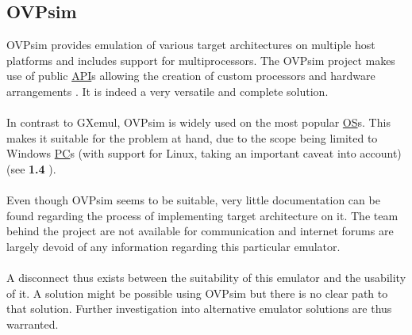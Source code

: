 \subsection{OVPsim}
\label{OVPsim}
OVPsim provides emulation of various target architectures on multiple host platforms and includes support for multiprocessors. The OVPsim project makes use of public \hyperref[listAbr]{API}s allowing the creation of custom processors and hardware arrangements \cite{Imperas2020}. It is indeed a very versatile and complete solution.
\\\\
In contrast to GXemul, OVPsim is widely used on the most popular \hyperref[listAbr]{OS}s. This makes it suitable for the problem at hand, due to the scope being limited to Windows \hyperref[listAbr]{PC}s (with support for Linux, taking an important caveat into account)(see \textbf{1.4 }).
\\\\
	Even though OVPsim seems to be suitable, very little documentation can be found regarding the process of implementing target architecture on it. The team behind the project are not available for communication and internet forums are largely devoid of any information regarding this particular emulator. 
\\\\
A disconnect thus exists between the suitability of this emulator and the usability of it. A solution might be possible using OVPsim but there is no clear path to that solution. Further investigation into alternative emulator solutions are thus warranted.

